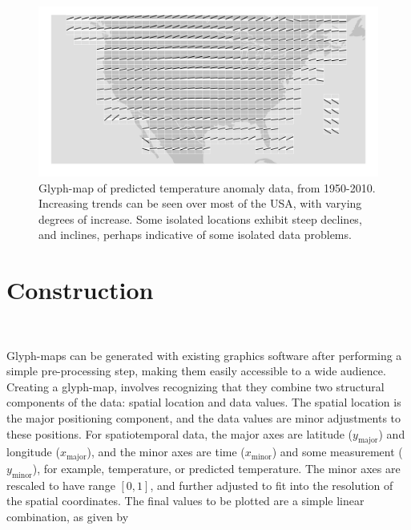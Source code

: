 \documentclass[oneside]{article}
\newcommand\amin{\text{minor}}
\newcommand\amaj{\text{major}}
\begin{document}
\begin{figure}[htbp]
  \centering
  \includegraphics[width=1\linewidth]{gistemp-pred}%

  \caption{Glyph-map of predicted temperature anomaly data, from
    1950-2010. Increasing trends can be seen over most of the USA,
    with varying degrees of increase. Some isolated locations exhibit
    steep declines, and inclines, perhaps indicative of some isolated
    data problems.}
  \label{fig:gistemp-pred}
\end{figure}



\section{Construction}~\label{sec:construction}

Glyph-maps can be generated with existing graphics software after performing a simple pre-processing step, making them easily accessible to a wide audience. Creating a glyph-map, involves recognizing that they combine two structural components of the data: spatial location and data values. The spatial location is the major positioning component, and the data values are minor adjustments to these positions. For spatiotemporal data, the major axes are latitude ($y_{\amaj}$) and longitude ($x_{\amaj}$), and the minor axes are time ($x_{\amin}$) and some measurement ($y_{\amin}$), for example, temperature, or predicted temperature. The minor axes are rescaled to have range $[0, 1]$, and further adjusted to fit into the resolution of the spatial coordinates. The final values to be plotted are a simple linear combination, as given by
\end{document}
